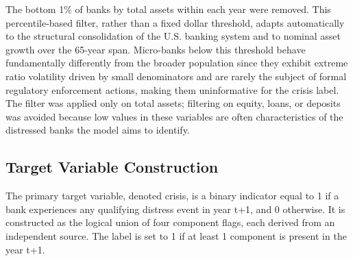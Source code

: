 \documentclass[conference]{IEEEtran}
\begin{document}
The bottom 1\% of banks by total assets within each year were removed. This percentile-based filter, rather than a fixed dollar threshold, adapts automatically to the structural consolidation of the U.S. banking system and to nominal asset growth over the 65-year span. Micro-banks below this threshold behave fundamentally differently from the broader population since they exhibit extreme ratio volatility driven by small denominators and are rarely the subject of formal regulatory enforcement actions, making them uninformative for the crisis label. The filter was applied only on total assets; filtering on equity, loans, or deposits was avoided because low values in these variables are often characteristics of the distressed banks the model aims to identify.

\subsection{Target Variable Construction}
The primary target variable, denoted crisis, is a binary indicator equal to 1 if a bank experiences any qualifying distress event in year t+1, and 0 otherwise. It is constructed as the logical union of four component flags, each derived from an independent source. The label is set to 1 if at least 1 component is present in the year t+1.
\end{document}
